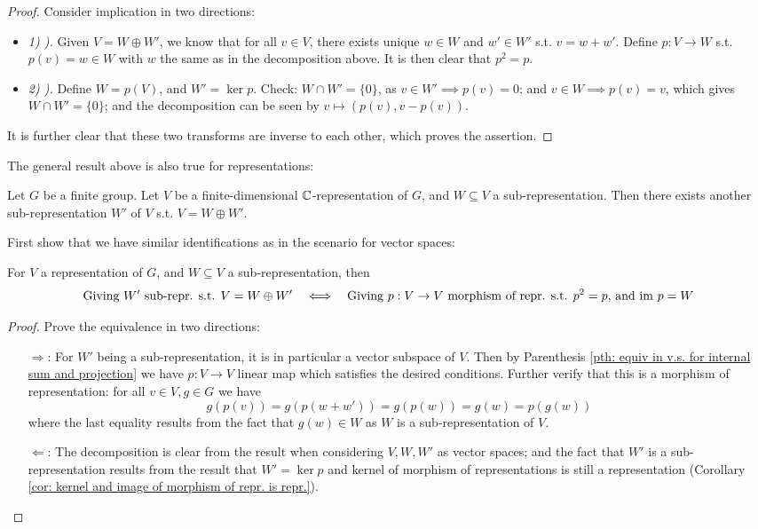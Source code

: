 \begin{proof}
    Consider implication in two directions:
    \begin{itemize}
        \item \emph{1) ).} Given $V = W \oplus W'$, we know that for all $v \in V$, there exists unique $w \in W$ and $w' \in W'$ s.t. $v = w + w'$. Define $p: V \to W$ s.t. $p(v) = w \in W$ with $w$ the same as in the decomposition above. It is then clear that $p^2 = p$.
        \item \emph{2) ).} Define $W = p(V)$, and $W' = \ker p$. Check: $W \cap W' = \{0\}$, as $v \in W' \implies p(v) = 0$; and $v \in W \implies p(v) = v$, which gives $W \cap W' = \{0\}$; and the decomposition can be seen by $v \mapsto (p(v), v - p(v))$.
    \end{itemize}
    It is further clear that these two transforms are inverse to each other, which proves the assertion.
\end{proof}

\textstart
The general result above is also true for representations:
\begin{theorem}\label{thm: decomposition of repr.}
    Let $G$ be a finite group. Let $V$ be a finite-dimensional $\mathbb{C}$-representation of $G$, and $W \subseteq V$ a sub-representation. Then there exists another sub-representation $W'$ of $V$ s.t. $V = W \oplus W'$.
\end{theorem}

First show that we have similar identifications as in the scenario for vector spaces: 
\begin{proposition}
    For $V$ a representation of $G$, and $W \subseteq V$ a sub-representation, then
    \[
        \text{Giving $W'$ sub-repr. s.t. $V = W \oplus W'$} \quad \Longleftrightarrow \quad \text{Giving $p: V \to V$ morphism of repr. s.t. $p^2 = p$, and $\mathrm{im}\  p = W$}
    \]
\end{proposition}
\begin{proof}
    Prove the equivalence in two directions:
    \begin{itemize}
        \item[$\Rightarrow$:] For $W'$ being a sub-representation, it is in particular a vector subspace of $V$. Then by Parenthesis \ref{pth: equiv in v.s. for internal sum and projection} we have $p: V \to V$ linear map which satisfies the desired conditions. Further verify that this is a morphism of representation: for all $v \in V, g \in G$ we have
        \[
            g(p(v)) = g(p(w + w')) = g(p(w)) = g(w) = p(g(w))
            \]
            where the last equality results from the fact that $g(w) \in W$ as $W$ is a sub-representation of $V$. 
        \item[$\Leftarrow$:] The decomposition is clear from the result when considering $V, W, W'$ as vector spaces; and the fact that $W'$ is a sub-representation results from the result that $W' = \ker p$ and kernel of morphism of representations is still a representation (Corollary \ref{cor: kernel and image of morphism of repr. is repr.}).
    \end{itemize}
\end{proof}

